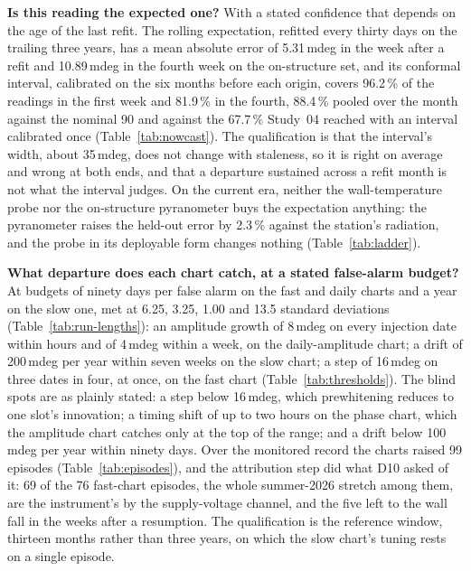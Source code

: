 \documentclass[11pt,a4paper]{article}
\begin{document}
\textbf{Is this reading the expected one?} With a stated confidence that
depends on the age of the last refit. The rolling expectation, refitted
every thirty days on the trailing three years, has a mean absolute error of
5.31\,mdeg in the week after a refit and 10.89\,mdeg in the fourth week on
the on-structure set, and its conformal interval, calibrated on the six
months before each origin, covers 96.2\,\% of the readings in the first week
and 81.9\,\% in the fourth, 88.4\,\% pooled over the month against the
nominal 90 and against the 67.7\,\% Study~04 reached with an interval
calibrated once (Table~\ref{tab:nowcast}). The qualification is that the
interval's width, about 35\,mdeg, does not change with staleness, so it is
right on average and wrong at both ends, and that a departure sustained
across a refit month is not what the interval judges. On the current era,
neither the wall-temperature probe nor the on-structure pyranometer buys the
expectation anything: the pyranometer raises the held-out error by 2.3\,\%
against the station's radiation, and the probe in its deployable form
changes nothing (Table~\ref{tab:ladder}).

\textbf{What departure does each chart catch, at a stated false-alarm
budget?} At budgets of ninety days per false alarm on the fast and daily
charts and a year on the slow one, met at 6.25, 3.25, 1.00 and 13.5 standard
deviations (Table~\ref{tab:run-lengths}): an amplitude growth of 8\,mdeg on
every injection date within hours and of 4\,mdeg within a week, on the
daily-amplitude chart; a drift of 200\,mdeg per year within seven weeks on
the slow chart; a step of 16\,mdeg on three dates in four, at once, on the
fast chart (Table~\ref{tab:thresholds}). The blind spots are as plainly
stated: a step below 16\,mdeg, which prewhitening reduces to one slot's
innovation; a timing shift of up to two hours on the phase chart, which the
amplitude chart catches only at the top of the range; and a drift below
100\,mdeg per year within ninety days. Over the monitored record the charts
raised 99 episodes (Table~\ref{tab:episodes}), and the attribution step did
what D10 asked of it: 69 of the 76 fast-chart episodes, the whole
summer-2026 stretch among them, are the instrument's by the supply-voltage
channel, and the five left to the wall fall in the weeks after a resumption.
The qualification is the reference window, thirteen months rather than
three years, on which the slow chart's tuning rests on a single episode.
\end{document}
